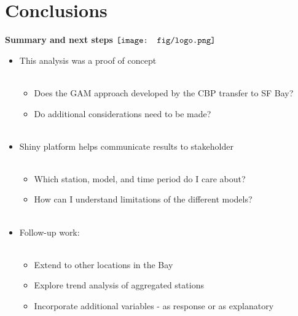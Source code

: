 \documentclass{beamer}
\begin{document}
\section{Conclusions}

\begin{frame}{\textbf{Summary and next steps} \hspace{0pt plus 1 filll} $\vcenter{\hbox{\texttt{[image: fig/logo.png]}}}$}
\begin{itemize}
\item This analysis was a proof of concept \\~\\
\begin{itemize}
\item Does the GAM approach developed by the CBP transfer to SF Bay?
\item Do additional considerations need to be made? \\~\\
\end{itemize}
\item Shiny platform helps communicate results to stakeholder  \\~\\
\begin{itemize}
\item Which station, model, and time period do I care about?
\item How can I understand limitations of the different models? \\~\\
\end{itemize}
\item Follow-up work: \\~\\
\begin{itemize}
\item Extend to other locations in the Bay
\item Explore trend analysis of aggregated stations
\item Incorporate additional variables - as response or as explanatory
\end{itemize}
\end{itemize}
\end{frame}
\end{document}
